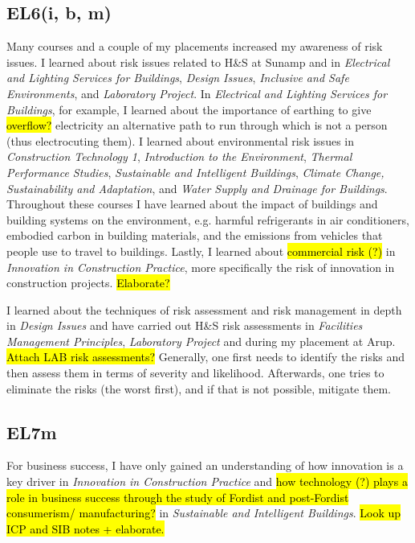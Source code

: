 \subsection*{EL6(i, b, m)}

Many courses and a couple of my placements increased my awareness of risk issues.
I learned about risk issues related to H\&S at Sunamp and in
\textit{Electrical and Lighting Services for Buildings},
\textit{Design Issues},
\textit{Inclusive and Safe Environments},
and
\textit{Laboratory Project}.
In \textit{Electrical and Lighting Services for Buildings}, for example, I learned about the importance of earthing to give \hl{overflow?} electricity an alternative path to run through which is not a person (thus electrocuting them).
I learned about environmental risk issues in
\textit{Construction Technology 1},
\textit{Introduction to the Environment},
\textit{Thermal Performance Studies},
\textit{Sustainable and Intelligent Buildings},
\textit{Climate Change, Sustainability and Adaptation},
and
\textit{Water Supply and Drainage for Buildings}.
Throughout these courses I have learned about the impact of buildings and building systems on the environment, e.g. harmful refrigerants in air conditioners, embodied carbon in building materials, and the emissions from vehicles that people use to travel to buildings.
Lastly, I learned about \hl{commercial risk (?)} in \textit{Innovation in Construction Practice}, more specifically the risk of innovation in construction projects.
\hl{Elaborate?}

I learned about the techniques of risk assessment and risk management in depth in \textit{Design Issues} and have carried out H\&S risk assessments in \textit{Facilities Management Principles}, \textit{Laboratory Project} and during my placement at Arup.
\hl{Attach LAB risk assessments?}
Generally, one first needs to identify the risks and then assess them in terms of severity and likelihood.
Afterwards, one tries to eliminate the risks (the worst first), and if that is not possible, mitigate them.


\subsection*{EL7m}

For business success, I have only gained an understanding of how innovation is a key driver in \textit{Innovation in Construction Practice} and \hl{how technology (?) plays a role in business success through the study of Fordist and post-Fordist consumerism/ manufacturing?} in \textit{Sustainable and Intelligent Buildings}.
\hl{Look up ICP and SIB notes + elaborate.}

